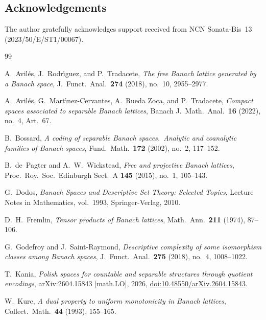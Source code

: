 \documentclass[12pt]{amsart}
\theoremstyle{plain}
\theoremstyle{definition}
\theoremstyle{remark}
\begin{document}
\subsection*{Acknowledgements}
The author gratefully acknowledges support received from
NCN Sonata-Bis~13 (2023/50/E/ST1/00067).



\begin{thebibliography}{99}

A.~Avil\'es, J.~Rodr\'\i guez, and P.~Tradacete,
\textit{The free Banach lattice generated by a Banach space},
J.~Funct.~Anal.\ \textbf{274} (2018), no.~10, 2955--2977.

A.~Avil\'es, G.~Mart\'\i nez-Cervantes, A.~Rueda Zoca, and P.~Tradacete,
\textit{Compact spaces associated to separable Banach lattices},
Banach J.~Math.~Anal.\ \textbf{16} (2022), no.~4, Art.~67.

B.~Bossard,
\textit{A coding of separable Banach spaces.\ Analytic and coanalytic families
of Banach spaces},
Fund.~Math.\ \textbf{172} (2002), no.~2, 117--152.

B.~de~Pagter and A.~W.~Wickstead,
\textit{Free and projective Banach lattices},
Proc.~Roy.~Soc.~Edinburgh Sect.~A \textbf{145} (2015), no.~1, 105--143.

G.~Dodos,
\textit{Banach Spaces and Descriptive Set Theory: Selected Topics},
Lecture Notes in Mathematics, vol.~1993, Springer-Verlag, 2010.

D.~H.~Fremlin,
\textit{Tensor products of Banach lattices},
Math.~Ann.\ \textbf{211} (1974), 87--106.

G.~Godefroy and J.~Saint-Raymond,
\textit{Descriptive complexity of some isomorphism classes among Banach spaces},
J.~Funct.~Anal.\ \textbf{275} (2018), no.~4, 1008--1022.

T.~Kania,
\textit{Polish spaces for countable and separable structures through quotient
encodings},
arXiv:2604.15843 [math.LO], 2026,
\href{https://doi.org/10.48550/arXiv.2604.15843}{doi:10.48550/arXiv.2604.15843}.

W.~Kurc,
\textit{A dual property to uniform monotonicity in Banach lattices},
Collect.\ Math.\ \textbf{44} (1993), 155--165.


\end{thebibliography}
\end{document}
